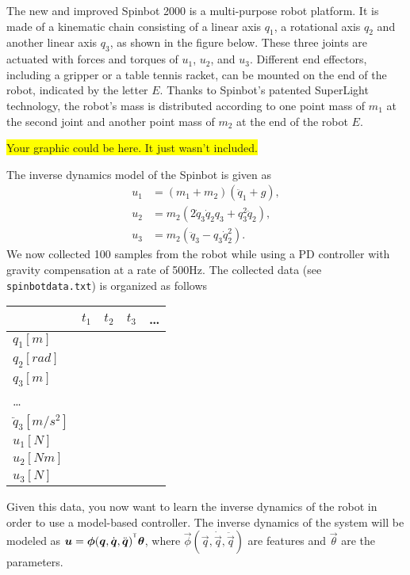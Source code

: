 The new and improved Spinbot 2000 is a multi-purpose robot platform.
It is made of a kinematic chain consisting of a linear axis $q_{1}$, a rotational axis $q_{2}$ and another linear axis $q_{3}$, as shown in the figure below.
These three joints are actuated with forces and torques of $u_{1}$, $u_{2}$, and $u_{3}$.
Different end effectors, including a gripper or a table tennis racket, can be mounted on the end of the robot, indicated by the letter $E$.
Thanks to Spinbot's patented SuperLight technology, the robot's mass is distributed according to one point mass of $m_{1}$ at the second joint and another point mass of $m_{2}$ at the end of the robot $E$.

\colorbox{yellow}{Your graphic could be here. It just wasn't included.}

The inverse dynamics model of the Spinbot is given as
\begin{align*}
u_{1} &= (m_{1}+m_{2})(\ddot{q}_{1}+g),\\
u_{2} &= m_{2}(2\dot{q}_{3}\dot{q}_{2}q_{3}+q_{3}^{2}\ddot{q}_{2}),\\
u_{3} &= m_{2}(\ddot{q}_{3}-q_{3}\dot{q}_{2}^{2}).
\end{align*}
We now collected 100 samples from the robot while using a PD controller with gravity compensation at a rate of 500Hz.
The collected data (see \texttt{spinbotdata.txt}) is organized as follows\\
\begin{tabular}{| l || c | c | c | l  }
  \hline
   & $t_1$ & $t_2$ & $t_3$ & \ldots\\
  \hline
  \hline
  $q_{1}[m]$ &  &  &  & \\
  \hline
  $q_{2}[rad]$ &  &  &  & \\
  \hline
  $q_{3}[m]$ &  &  &  & \\
  \hline
  \ldots &  &  &  &  \\
  \hline
  $\ddot{q}_{3}[m/s^{2}]$ &  &  &  & \\
  \hline
  $u_{1}[N]$ &  &  &  & \\
  \hline
  $u_{2}[Nm]$ &  &  &  & \\
  \hline
  $u_{3}[N]$ &  &  &  & \\
  \hline
\end{tabular}

Given this data, you now want to learn the inverse dynamics of the robot in order to use a model-based controller.
The inverse dynamics of the system will be modeled as ${\boldsymbol{u}}={\boldsymbol{\phi}}({\boldsymbol{q}},\dot{{\boldsymbol{q}}},\ddot{{\boldsymbol{q}}})^{^\mathsf{T}}{\boldsymbol{\theta}}$, where $\vec{\phi}(\vec{q},\dot{\vec{q}},\ddot{\vec{q}})$ are features and $\vec{\theta}$ are the parameters.

